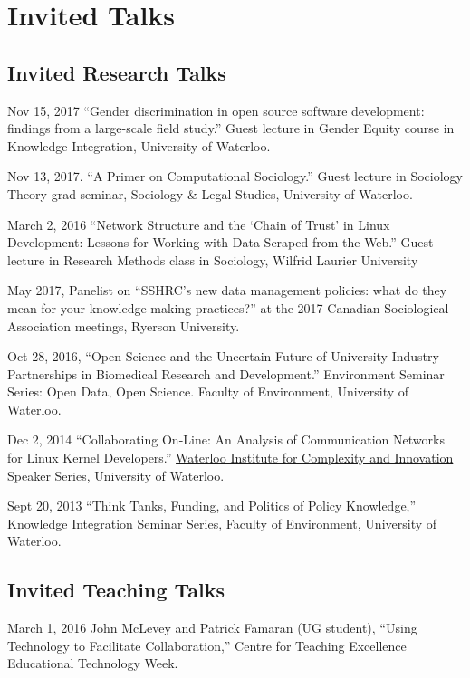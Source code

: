 \section{Invited Talks}\label{invited-talks}

\subsection{Invited Research Talks}\label{invited-research-talks}

\ind Nov 15, 2017 ``Gender discrimination in open source software
development: findings from a large-scale field study.'' Guest lecture in
Gender Equity course in Knowledge Integration, University of Waterloo.

\ind Nov 13, 2017. ``A Primer on Computational Sociology.'' Guest
lecture in Sociology Theory grad seminar, Sociology \& Legal Studies,
University of Waterloo.

\ind March 2, 2016 ``Network Structure and the `Chain of Trust' in Linux
Development: Lessons for Working with Data Scraped from the Web.'' Guest
lecture in Research Methods class in Sociology, Wilfrid Laurier
University

\ind May 2017, Panelist on ``SSHRC's new data management policies: what
do they mean for your knowledge making practices?'' at the 2017 Canadian
Sociological Association meetings, Ryerson University.

\ind Oct 28, 2016, ``Open Science and the Uncertain Future of
University-Industry Partnerships in Biomedical Research and
Development.'' Environment Seminar Series: Open Data, Open Science.
Faculty of Environment, University of Waterloo.

\ind Dec 2, 2014 ``Collaborating On-Line: An Analysis of Communication
Networks for Linux Kernel Developers.'' \href{http://wici.ca/}{Waterloo
Institute for Complexity and Innovation} Speaker Series, University of
Waterloo.

\ind Sept 20, 2013 ``Think Tanks, Funding, and Politics of Policy
Knowledge,'' Knowledge Integration Seminar Series, Faculty of
Environment, University of Waterloo.

\subsection{Invited Teaching Talks}\label{invited-teaching-talks}

\ind March 1, 2016 John McLevey and Patrick Famaran (UG student),
``Using Technology to Facilitate Collaboration,'' Centre for Teaching
Excellence Educational Technology Week.

